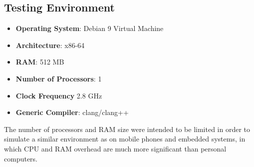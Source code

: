 \documentclass[]{article}
\begin{document}
	\subsection{Testing Environment}
	\begin{itemize}
		\item \textbf{Operating System}: Debian 9 Virtual Machine
		\item \textbf{Architecture}: x86-64
		\item \textbf{RAM}: 512 MB
		\item \textbf{Number of Processors}: 1 
		\item \textbf{Clock Frequency} 2.8 GHz
		\item \textbf{Generic Compiler}: clang/clang++
	\end{itemize}
	The number of processors and RAM size were intended to be limited in order to simulate a similar environment as on mobile phones and embedded systems, in which CPU and RAM overhead are much more significant than personal computers.
\end{document}
